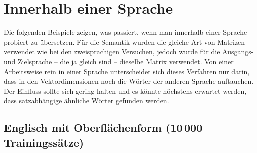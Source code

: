 \documentclass[11pt,twoside,openright]{mpreport}
\begin{document}
\section{Innerhalb einer Sprache}
Die folgenden Beispiele zeigen, was passiert, wenn man innerhalb einer Sprache probiert zu übersetzen. Für die Semantik wurden die gleiche Art von Matrizen verwendet wie bei den zweisprachigen Versuchen, jedoch wurde für die Ausgangs- und Zielsprache -- die ja gleich sind -- dieselbe Matrix verwendet. Von einer Arbeitsweise rein in einer Sprache unterscheidet sich dieses Verfahren nur darin, dass in den Vektordimensionen noch die Wörter der anderen Sprache auftauchen. Der Einfluss sollte sich gering halten und es könnte höchstens erwartet werden, dass satzabhängige ähnliche Wörter gefunden werden.

\subsection{Englisch mit Oberflächenform (10\,000 Trainingssätze)}
\end{document}
